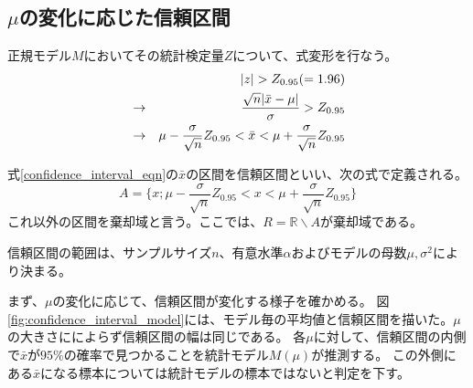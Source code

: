 


\subsection{$\mu$の変化に応じた信頼区間}
正規モデル$M$においてその統計検定量$Z$について、式変形を行なう。
\begin{eqnarray}
    & &|z| > Z_{0.95}( = 1.96 ) \notag \\
    &\rightarrow& \frac{\sqrt{n}|\bar{x}-\mu|}{\sigma} > Z_{0.95} \notag\\
    &\rightarrow& \mu-\frac{\sigma}{\sqrt{n}}Z_{0.95} < \bar{x} < \mu+\frac{\sigma}{\sqrt{n}}Z_{0.95} \label{confidence_interval_eqn}
\end{eqnarray}
\begin{defi}
式\eqref{confidence_interval_eqn}の$\bar{x}$の区間を信頼区間といい、次の式で定義される。
\begin{equation*}
    A=\{x;\mu-\frac{\sigma}{\sqrt{n}}Z_{0.95} < x < \mu+\frac{\sigma}{\sqrt{n}}Z_{0.95} \}
\end{equation*}
これ以外の区間を棄却域と言う。ここでは、$R=\mathbb{R}\backslash A$が棄却域である。
\end{defi}
信頼区間の範囲は、サンプルサイズ$n$、有意水準$\alpha$およびモデルの母数$\mu,\sigma^2$により決まる。

まず、$\mu$の変化に応じて、信頼区間が変化する様子を確かめる。
図\ref{fig:confidence_interval_model}には、モデル毎の平均値と信頼区間を描いた。$\mu$の大きさにによらず信頼区間の幅は同じである。
各$\mu$に対して、信頼区間の内側で$\bar{x}$が$95\%$の確率で見つかることを統計モデル$M(\mu)$が推測する。
この外側にある$\bar{x}$になる標本については統計モデルの標本ではないと判定を下す。

